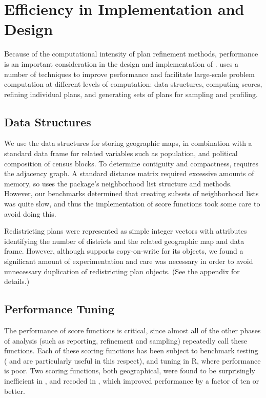 \documentclass[article]{JSSstyle/jss}
\begin{document}
\section{Efficiency in Implementation and Design}

Because of the computational intensity of plan refinement methods, performance 
is an important consideration in the design and implementation of .  uses a number
of techniques to improve performance and facilitate large-scale problem computation 
at different levels of computation: data structures, computing scores, refining 
individual plans, and generating sets of plans for sampling and profiling. 

\subsection{Data Structures}

We use the  \citep{Lewin07} data structures for storing 
geographic maps, in combination with a standard data frame for related variables such as 
population, and political composition of census blocks.  To determine contiguity and compactness, 
 requires the adjacency graph. A standard distance matrix required excessive amounts of memory, 
so  uses the  \citep{Bivand07} package's neighborhood list structure and methods. 
However, our benchmarks determined that creating subsets of neighborhood lists was quite slow, and 
thus the implementation of score functions took some care to avoid doing this.

Redistricting plans were represented as simple integer vectors with attributes 
identifying the number of districts and the related geographic map and data frame.  
However, although  supports copy-on-write for its objects, we found a 
significant amount of experimentation and care was necessary in order to avoid unnecessary duplication of redistricting plan objects. (See the appendix for details.) 

\subsection{Performance Tuning} 

The performance of score functions is critical, since almost all of the other phases of 
 analysis (such as reporting, refinement and sampling) repeatedly call these functions.
Each of these scoring functions has been subject to benchmark testing ( and  are particularly useful in this respect), and tuning in R, where performance 
is poor. Two scoring functions, both geographical, were found to be surprisingly inefficient in , 
and recoded in , which improved performance by a factor of ten or better. 
\end{document}
